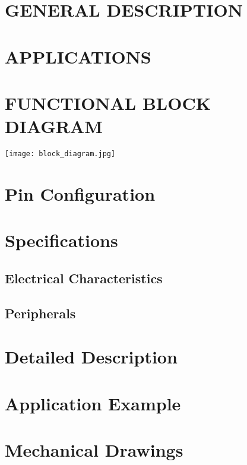 \documentclass{../templates/datasheet}
\begin{document}
\section{GENERAL DESCRIPTION}


\section{APPLICATIONS}


\section{FUNCTIONAL BLOCK DIAGRAM}
\texttt{[image: block\_diagram.jpg]}


\pagebreak
\tableofcontents
\pagebreak



\section{Pin Configuration}

\section{Specifications}
\subsection{Electrical Characteristics}
\subsection{Peripherals}




\section{Detailed Description}

\section{Application Example}

\section{Mechanical Drawings}
\end{document}
